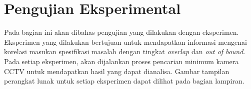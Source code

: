 

\section{Pengujian Eksperimental}
Pada bagian ini akan dibahas pengujian yang dilakukan dengan eksperimen. Eksperimen yang dilakukan bertujuan untuk mendapatkan informasi mengenai korelasi masukan spesifikasi masalah dengan tingkat \textit{overlap} dan \textit{out of bound}. Pada setiap eksperimen, akan dijalankan proses pencarian minimum kamera CCTV untuk mendapatkan hasil yang dapat dianalisa. Gambar tampilan perangkat lunak untuk setiap eksperimen dapat dilihat pada bagian lampiran.

